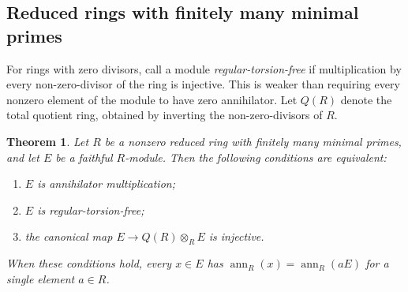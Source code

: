 \documentclass[11pt]{amsart}
\theoremstyle{plain}
\newtheorem{theorem}{Theorem}[section]
\theoremstyle{definition}
\theoremstyle{remark}
\newcommand{\ann}{\operatorname{ann}}
\numberwithin{equation}{section}
\begin{document}
\subsection{Reduced rings with finitely many minimal primes}

For rings with zero divisors, call a module \emph{regular-torsion-free}
if multiplication by every non-zero-divisor of the ring is injective.
This is weaker than requiring every nonzero element of the module to
have zero annihilator. Let $Q(R)$ denote the total quotient ring,
obtained by inverting the non-zero-divisors of $R$.

\begin{theorem}\label{thm:reduced-finite-min}
Let $R$ be a nonzero reduced ring with finitely many minimal primes,
and let $E$ be a faithful $R$-module. Then the following conditions
are equivalent:
\begin{enumerate}[label=\textup{(\roman*)}]
\item $E$ is annihilator multiplication;
\item $E$ is regular-torsion-free;
\item the canonical map $E\to Q(R)\otimes_R E$ is injective.
\end{enumerate}
When these conditions hold, every $x\in E$ has
$\ann_R(x)=\ann_R(aE)$ for a single element $a\in R$.
\end{theorem}
\end{document}
